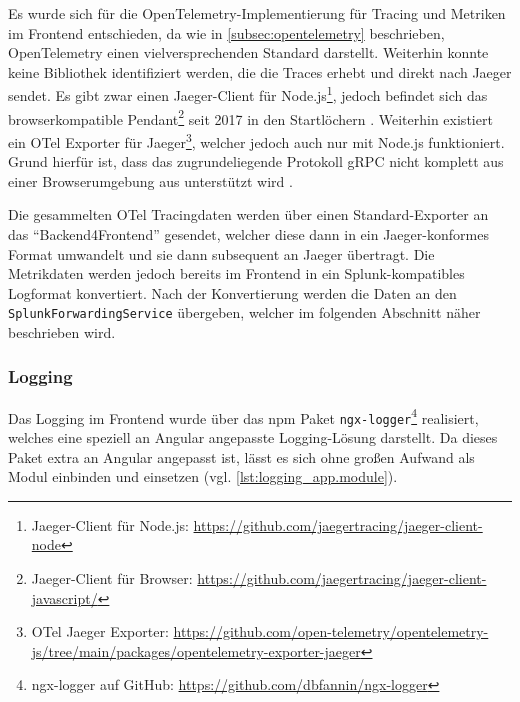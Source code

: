Es wurde sich für die OpenTelemetry-Implementierung für Tracing und Metriken im Frontend entschieden, da wie in \autoref{subsec:opentelemetry} beschrieben, OpenTelemetry einen vielversprechenden Standard darstellt. Weiterhin konnte keine Bibliothek identifiziert werden, die die Traces erhebt und direkt nach Jaeger sendet. Es gibt zwar einen Jaeger-Client für Node.js\footnote{Jaeger-Client für Node.js: \url{https://github.com/jaegertracing/jaeger-client-node}}, jedoch befindet sich das browserkompatible Pendant\footnote{Jaeger-Client für Browser: \url{https://github.com/jaegertracing/jaeger-client-javascript/}} seit 2017 in den Startlöchern \cite{JaegerJSClientUsageInABrowser}. Weiterhin existiert ein OTel Exporter für Jaeger\footnote{OTel Jaeger Exporter: \url{https://github.com/open-telemetry/opentelemetry-js/tree/main/packages/opentelemetry-exporter-jaeger}}, welcher jedoch auch nur mit Node.js funktioniert. Grund hierfür ist, dass das zugrundeliegende Protokoll gRPC \cite{grpc} nicht komplett aus einer Browserumgebung aus unterstützt wird \cite{grpcWebLimitations}.


Die gesammelten OTel Tracingdaten werden über einen Standard-Exporter an das \enquote{Backend4Frontend} gesendet, welcher diese dann in ein Jaeger-konformes Format umwandelt und sie dann subsequent an Jaeger übertragt. Die Metrikdaten werden jedoch bereits im Frontend in ein Splunk-kompatibles Logformat konvertiert. Nach der Konvertierung werden die Daten an den \texttt{SplunkForwardingService} übergeben, welcher im folgenden Abschnitt näher beschrieben wird.

\subsubsection{Logging}

Das Logging im Frontend wurde über das npm \cite{NPM} Paket \texttt{ngx-logger}\footnote{ngx-logger auf GitHub: \url{https://github.com/dbfannin/ngx-logger}} realisiert, welches eine speziell an Angular angepasste Logging-Lösung darstellt. Da dieses Paket extra an Angular angepasst ist, lässt es sich ohne großen Aufwand als Modul einbinden und einsetzen (vgl. \autoref{lst:logging_app.module}).



